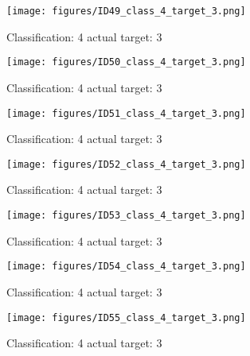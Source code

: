 \begin{figure}[h!]
\begin{center}
\texttt{[image: figures/ID49\_class\_4\_target\_3.png]}
\end{center}
\caption{ Classification: 4 actual target: 3}
\label{fig:ID49_class_4_target_3}
\end{figure}
\begin{figure}[h!]
\begin{center}
\texttt{[image: figures/ID50\_class\_4\_target\_3.png]}
\end{center}
\caption{ Classification: 4 actual target: 3}
\label{fig:ID50_class_4_target_3}
\end{figure}
\begin{figure}[h!]
\begin{center}
\texttt{[image: figures/ID51\_class\_4\_target\_3.png]}
\end{center}
\caption{ Classification: 4 actual target: 3}
\label{fig:ID51_class_4_target_3}
\end{figure}
\begin{figure}[h!]
\begin{center}
\texttt{[image: figures/ID52\_class\_4\_target\_3.png]}
\end{center}
\caption{ Classification: 4 actual target: 3}
\label{fig:ID52_class_4_target_3}
\end{figure}
\begin{figure}[h!]
\begin{center}
\texttt{[image: figures/ID53\_class\_4\_target\_3.png]}
\end{center}
\caption{ Classification: 4 actual target: 3}
\label{fig:ID53_class_4_target_3}
\end{figure}
\begin{figure}[h!]
\begin{center}
\texttt{[image: figures/ID54\_class\_4\_target\_3.png]}
\end{center}
\caption{ Classification: 4 actual target: 3}
\label{fig:ID54_class_4_target_3}
\end{figure}
\begin{figure}[h!]
\begin{center}
\texttt{[image: figures/ID55\_class\_4\_target\_3.png]}
\end{center}
\caption{ Classification: 4 actual target: 3}
\label{fig:ID55_class_4_target_3}
\end{figure}
